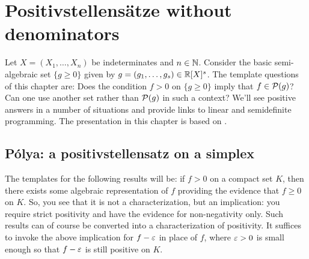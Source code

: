 \section{Positivstellensätze without denominators}

Let $X=(X_1,\ldots,X_n)$ be indeterminates and $n \in \mathbb{N}$. Consider the basic semi-algebraic set $\{g \ge 0\}$ given by $g =(g_1,\ldots,g_s) \in \mathbb{R}[X]^s$.  The template questions of this chapter are: Does the condition $f > 0$ on $\{g \ge 0\}$ imply that $f \in \mathcal{P}(g)$? Can one use another set rather than $\mathcal{P}(g)$ in such a context? We'll see positive answers in a number of situations and provide links to linear and semidefinite programming.
The presentation in this chapter is based on \cite{averkov2013constructive}.


%


\subsection{P\'olya: a positivstellensatz on a simplex}

The templates for the following results will be: if $f > 0$ on a compact set $K$, then there exists some algebraic representation of $f$ providing the evidence that $f \ge 0$ on $K$. So, you see that it is not a characterization, but an implication: you require strict positivity and have the evidence for non-negativity only. Such results can of course be converted into a characterization of positivity. It suffices to invoke the above implication for $f - {\operatorname{\varepsilon}}$ in place of $f$, where ${\operatorname{\varepsilon}}>0$ is small enough so that $f - {\operatorname{\varepsilon}}$ is still positive on $K$. 


